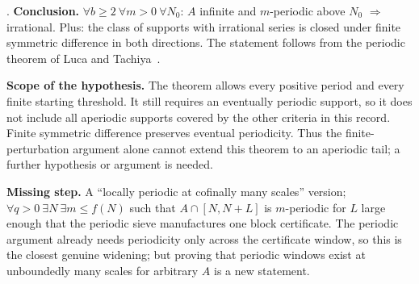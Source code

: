 \begin{obs}
.
\textbf{Conclusion.} $\forall b\ge2\ \forall m{>}0\ \forall N_0$: $A$ infinite and $m$-periodic above
$N_0$ $\Rightarrow$ irrational. Plus: the class of supports with irrational series is closed
under finite symmetric difference in both directions. The statement follows from the periodic
theorem of Luca and Tachiya~\cite[Theorem~A, p.~139]{lucatachiya2017}.

\par\medskip

\textbf{Scope of the hypothesis.} The theorem allows every positive
period and every finite starting threshold.  It still requires an
eventually periodic support, so it does not include all aperiodic
supports covered by the other criteria in this record.  Finite
symmetric difference preserves eventual periodicity.  Thus the
finite-perturbation argument alone cannot extend this theorem to an
aperiodic tail; a further hypothesis or argument is needed.

\par\medskip

\textbf{Missing step.} A ``locally periodic at cofinally many scales'' version; $\forall q{>}0\
\exists N\ \exists m\le f(N)$ such that $A\cap[N,N{+}L]$ is $m$-periodic for $L$ large enough
that the periodic sieve manufactures one block certificate. The periodic argument already
needs periodicity only across the certificate window, so this is the closest genuine
widening; but proving that periodic windows exist at unboundedly many scales for arbitrary $A$
is a new statement.
\end{obs}

